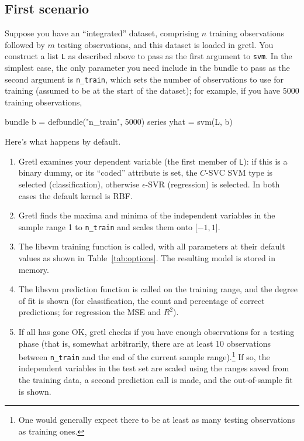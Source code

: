 \documentclass{article}
\begin{document}
\subsection{First scenario}
\label{sec:s1}

Suppose you have an ``integrated'' dataset, comprising $n$ training
observations followed by $m$ testing observations, and this dataset is
loaded in gretl. You construct a list \texttt{L} as described above to
pass as the first argument to \texttt{svm}. In the simplest case, the
only parameter you need include in the bundle to pass as the second
argument is \texttt{n\_train}, which sets the number of observations
to use for training (assumed to be at the start of the dataset); for
example, if you have 5000 training observations,
\begin{code}
bundle b = defbundle("n_train", 5000)
series yhat = svm(L, b)
\end{code}

Here's what happens by default.
\begin{enumerate}
\item Gretl examines your dependent variable (the first member of
  \texttt{L}): if this is a binary dummy, or its ``coded'' attribute
  is set, the $C$-SVC SVM type is selected (classification), otherwise
  $\epsilon$-SVR (regression) is selected. In both cases the default
  kernel is RBF.
\item Gretl finds the maxima and minima of the independent variables
  in the sample range 1 to \texttt{n\_train} and scales them onto
  [$-1,1$].
\item The \textsf{libsvm} training function is called, with all
  parameters at their default values as shown in
  Table~\ref{tab:options}. The resulting model is stored in memory.
\item The \textsf{libsvm} prediction function is called on the
  training range, and the degree of fit is shown (for classification,
  the count and percentage of correct predictions; for regression the
  MSE and $R^2$).
\item If all has gone OK, gretl checks if you have enough observations
  for a testing phase (that is, somewhat arbitrarily, there are at
  least 10 observations between \texttt{n\_train} and the end of the
  current sample range).\footnote{One would generally expect there to
    be at least as many testing observations as training ones.} If
  so, the independent variables in the test set are scaled using the
  ranges saved from the training data, a second prediction call is
  made, and the out-of-sample fit is shown.
\end{enumerate}
\end{document}
